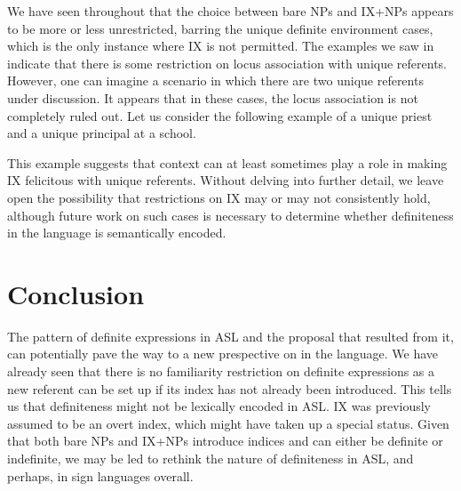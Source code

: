 \documentclass[output=paper,
modfonts
]{langscibook}
\begin{document}
We have seen throughout that the choice between bare NPs and IX+NPs appears to be more or less unrestricted, barring the unique definite environment cases, which is the only instance where IX is not permitted. The examples we saw in  indicate that there is some restriction on locus association with unique referents. However, one can imagine a scenario in which there are two unique referents under discussion. It appears that in these cases, the locus association is not completely ruled out. Let us consider the following example of a unique priest and a unique principal at a school. 

\begin{exe} 
	
	
\end{exe} 

\noindent This example suggests that context can at least sometimes play a role in making IX felicitous with unique referents. Without delving into further detail, we leave open the possibility that  restrictions on IX may or may not consistently hold, although future work on such cases is necessary to determine whether definiteness in the language is semantically encoded.  

\section{Conclusion}

The pattern of definite expressions in ASL and the proposal that resulted from it, can potentially pave the way to a new prespective on  in the language. We have already seen that there is no familiarity restriction on definite expressions as a new referent can be set up if its index has not already been introduced. This tells us that definiteness might not be lexically encoded in ASL. IX was previously assumed to be an overt index, which might have taken up a special status. Given that both bare NPs and IX+NPs introduce indices and can either be definite or indefinite, we may be led to rethink the nature of definiteness in ASL, and perhaps, in sign languages overall. 
\end{document}
